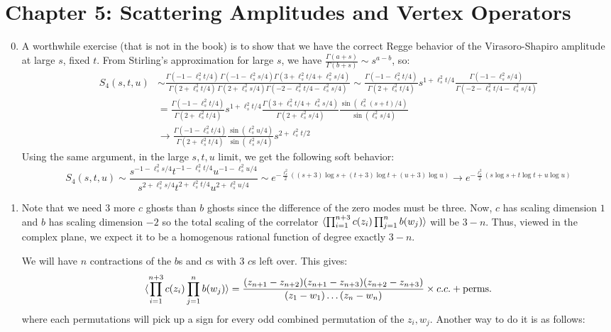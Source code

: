 \documentclass[11pt, class=article, crop=false]{standalone}
\begin{document}
\section*{Chapter 5: Scattering Amplitudes and Vertex Operators} %
\label{sec:chapter_5_scattering_amplitudes_and_vertex_operators}
\begin{enumerate}
	\setcounter{enumi}{-1}
	\item A worthwhile exercise (that is not in the book) is to show that we have the correct Regge behavior of the Virasoro-Shapiro amplitude at large $s$, fixed $t$. From Stirling's approximation for large $s$, we have $\frac{\Gamma(a + s)}{\Gamma(b + s)} \sim s^{a-b}$, so:
	\[
	\begin{aligned}
		S_{4} (s, t, u) &\sim %
		  \frac{\Gamma(-1 - \ell_s^2 t/4) \, \Gamma(-1 - \ell_s^2 s/4)\Gamma(3 + \ell_s^2 t/4 + \ell_s^2 s/4)}{\Gamma(2 + \ell_s^2 t/4) \, \Gamma(2 + \ell_s^2 s/4)  \Gamma(-2-\ell_s^2 t/ 4 - \ell_s^2 s/4)} \sim \frac{\Gamma(-1 - \ell_s^2 t/4)}{\Gamma(2 + \ell_s^2 t/4)} s^{1 + \ell_s^2 t/4} \frac{\Gamma(-1 - \ell_s^2 s/4)}{\Gamma(-2 -\ell_s^2 t/4 - \ell_s^2 s/4)}\\
		  & = \frac{\Gamma(-1 - \ell_s^2 t/4)}{\Gamma(2 + \ell_s^2 t/4)} s^{1 + \ell_s^2 t/4} \frac{\Gamma(3 +\ell_s^2 t/4 + \ell_s^2 s/4)}{\Gamma(2 + \ell_s^2 s/4)} \frac{\sin(\ell_s^2 (s + t)/4)}{\sin(\ell_s^2 s/ 4)} \\
		  & \to \frac{\Gamma(-1 - \ell_s^2 t/4)}{\Gamma(2 + \ell_s^2 t/4)}  \frac{\sin(\ell_s^2 u/4)}{\sin(\ell_s^2 s/ 4)} s^{2 + \ell_s^2 t/2}
	\end{aligned}
	\]
	Using the same argument, in the large $s, t, u$ limit, we get the following soft behavior: 
	\[
		S_4(s, t, u) \sim \frac{s^{-1-\ell_s^2 s/4} t^{-1 - \ell_s^2 t/4} u^{-1-\ell_s^2 u/4}}{s^{2+\ell_s^2 s/4} t^{2 + \ell_s^2 t/4} u^{2+\ell_s^2 u/4}} \sim e^{-\frac{\ell_s^2}{2}((s+3) \log s + (t+3) \log t + (u+3) \log u)} \to e^{-\frac{\ell_s^2}{2} (s \log s + t \log t + u\log u)}
	\]
	\item
	Note that we need 3 more $c$ ghosts than $b$ ghosts since the difference of the zero modes must be three. Now, $c$ has scaling dimension $1$ and $b$ has scaling dimension $-2$ so the total scaling of the correlator $\braket{\prod_{i=1}^{n+3} c(z_i) \prod_{j=1}^n b(w_j)}$ will be $3-n$. Thus, viewed in the complex plane, we expect it to be a homogenous rational function of degree exactly $3-n$.
	
	 We will have $n$ contractions of the $b$s and $c$s with $3$ $c$s left over. This gives:
	\[
		\braket{\prod_{i=1}^{n+3} c(z_i) \prod_{j=1}^n b(w_j)} = \frac{(z_{n+1} - z_{n+2}) (z_{n+1} - z_{n+3}) (z_{n+2} - z_{n+3})}{(z_1 - w_1) \dots (z_n - w_n)} \times c.c. + \text{perms.}
	\]
	where each permutations will pick up a sign for every odd combined permutation of the $z_i, w_j$.
	Another way to do it is as follows: 
	

\end{enumerate}
\end{document}
